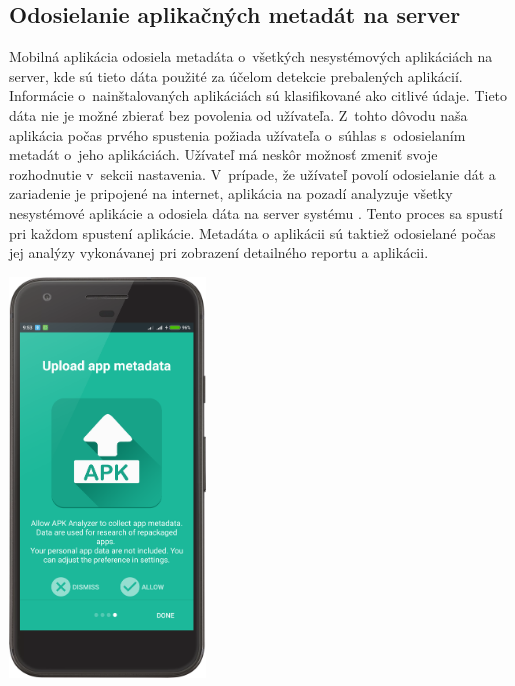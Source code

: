 \subsection{Odosielanie aplikačných metadát na server}
\begin{minipage}[H] {\textwidth}
\begin{minipage}[t]{0.48\textwidth}
Mobilná aplikácia odosiela metadáta o~všetkých nesystémových aplikáciách na server, kde sú tieto dáta použité za účelom detekcie prebalených aplikácií.
Informácie o~nainštalovaných aplikáciách sú klasifikované ako citlivé údaje. Tieto dáta nie je možné zbierať bez povolenia od užívateľa. Z~tohto dôvodu naša aplikácia počas prvého spustenia požiada užívateľa o~súhlas s~odosielaním metadát o~jeho aplikáciách. Užívateľ má neskôr možnosť zmeniť svoje rozhodnutie v~sekcii nastavenia.
V~prípade, že užívateľ povolí odosielanie dát a zariadenie je pripojené na internet, aplikácia na pozadí analyzuje všetky nesystémové aplikácie a odosiela dáta na server systému . Tento proces sa spustí pri každom spustení aplikácie. Metadáta o aplikácii sú taktiež odosielané počas jej analýzy vykonávanej pri zobrazení detailného reportu a aplikácii. 
\end{minipage}%
\hfill
\centering
\begin{minipage}[t][][b]{0.45\textwidth}
\centering
    \includegraphics[width=5.2cm]{images/app/upload_device.png}
\centering
{}
\label{fig:upload-dialog}
\end{minipage}%
\end{minipage}

